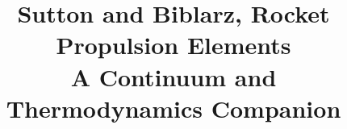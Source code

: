 
\title{Sutton and Biblarz, Rocket Propulsion Elements\\A Continuum and Thermodynamics Companion}

\maketitle
\begin{notesbody}
\tableofcontents








\end{notesbody}



